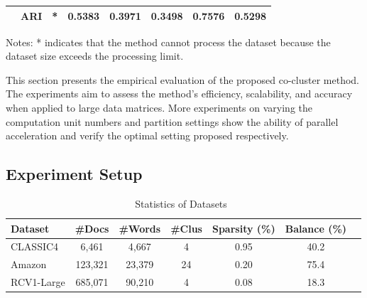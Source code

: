 \documentclass[journal]{IEEEtran}
\renewcommand{\cite}[1]{~\autocite{#1}}
\begin{document}
\begin{table}[htbp]
\begin{tabular}{@{} l c cccccc @{}}
                                & ARI                     & *                                                & 0.5383                                         & 0.3971                                           & 0.3498                                    & \textbf{0.7576}   & 0.5298              \\
    \bottomrule
  \end{tabular}
  \begin{tablenotes}
    \small
    \item Notes: * indicates that the method cannot process the dataset because the dataset size exceeds the processing limit.
  \end{tablenotes}
\end{table}

This section presents the empirical evaluation of the proposed co-cluster method. The experiments aim to assess the method's efficiency, scalability, and accuracy when applied to large data matrices. More experiments on varying the computation unit numbers and partition settings show the ability of parallel acceleration and verify the optimal setting proposed respectively.

\subsection{Experiment Setup}

\begin{table}[h]
  \centering
  \caption{Statistics of Datasets\cite{role2019CoClustPythonPackage}}
  \label{tab:dataset-statistics}
  \begin{tabular}{lccc@{}c@{}c@{}c}
    \hline
    \textbf{Dataset} & \textbf{\#Docs} & \textbf{\#Words} & \textbf{\#Clus} & \textbf{Sparsity (\%)} & \textbf{Balance (\%)} \\
    \hline
    CLASSIC4         & 6,461           & 4,667            & 4               & 0.95                   & 40.2                  \\
    Amazon           & 123,321         & 23,379           & 24              & 0.20                   & 75.4                  \\
    RCV1-Large       & 685,071         & 90,210           & 4               & 0.08                   & 18.3                  \\
    \hline
  \end{tabular}
\end{table}
\end{document}
